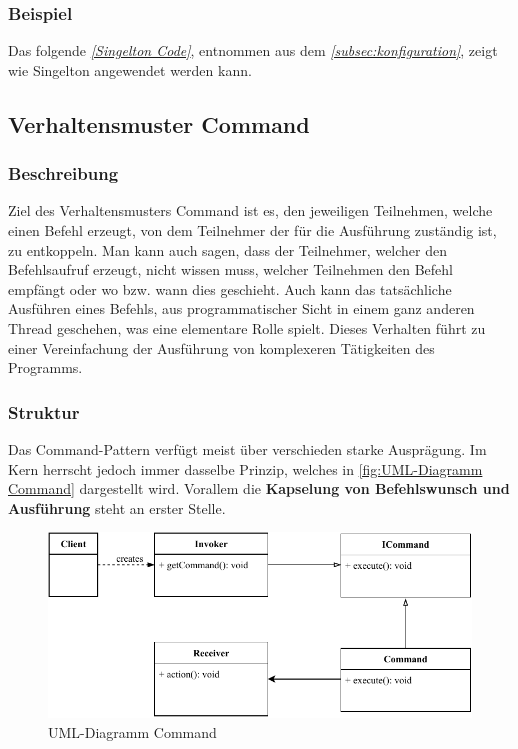 \subsubsection{Beispiel}
Das folgende \textit{\autoref{Singelton Code}}, entnommen aus dem \textit{\autoref{subsec:konfiguration}}, zeigt wie Singelton angewendet werden kann.

\subsection{Verhaltensmuster Command}\label{subsec:verhaltensmuster-command}
\subsubsection{Beschreibung}
Ziel des Verhaltensmusters Command ist es, den jeweiligen Teilnehmen, welche einen Befehl erzeugt, von dem Teilnehmer der für die Ausführung zuständig ist, zu entkoppeln.
Man kann auch sagen, dass der Teilnehmer, welcher den Befehlsaufruf erzeugt, nicht wissen muss, welcher Teilnehmen den Befehl empfängt oder wo bzw. wann dies geschieht.
Auch kann das tatsächliche Ausführen eines Befehls, aus programmatischer Sicht in einem ganz anderen Thread geschehen, was eine elementare Rolle spielt.
Dieses Verhalten führt zu einer Vereinfachung der Ausführung von komplexeren Tätigkeiten des Programms.
\subsubsection{Struktur}
Das Command-Pattern verfügt meist über verschieden starke Ausprägung.
Im Kern herrscht jedoch immer dasselbe Prinzip, welches in \autoref{fig:UML-Diagramm Command} dargestellt wird.
Vorallem die \textbf{Kapselung von Befehlswunsch und Ausführung} steht an erster Stelle.
\begin{figure}[H]
    \centering
    \includegraphics[width=1\textwidth]{fig/ainf/Command.pdf}
    \caption{UML-Diagramm Command}
    \label{fig:UML-Diagramm Command}
\end{figure}
